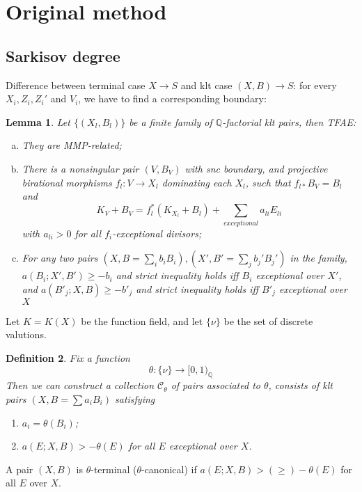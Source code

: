 \documentclass{article}
\newtheorem{defn}{Definition}[section]
\newtheorem{lem}[defn]{Lemma}
\begin{document}
\section{Original method}
 
\subsection{Sarkisov degree}
Difference between terminal case $ X\to S $ and klt case $ (X,B)\to S $: for every $ X_i,Z_i,Z_i' $ and $ V_i $, we have to find a corresponding boundary:

\begin{lem}
	Let $ \{(X_l,B_l)\} $ be a finite family of $ \mathbb{Q} $-factorial klt pairs, then TFAE:
	\begin{enumerate}[(a)]
		\item They are MMP-related;
		\item There is a nonsingular pair $ (V,B_V) $ with snc boundary, and projective birational morphisms $ f_l:V\to  X_l $ dominating each $ X_l $, such that $ f_{l*}B_V=B_l $ and
		$$ K_V+B_V=f_l^*(K_{X_l}+B_l)+\sum_{exceptional}{a_{li}E_{li}} $$
		with $ a_{li}>0 $ for all $ f_i $-exceptional divisors;
		\item For any two pairs $ (X,B=\sum_ib_iB_i),(X',B'=\sum _jb_j'B_j') $ in the family,  $ a(B_i;X',B')\geqslant -b_i $ and strict inequality holds iff $ B_i $ exceptional over $ X' $, and $ a(B'_j;X,B)\geqslant -b'_j $ and strict inequality holds iff $ B'_j $ exceptional over $ X $
	\end{enumerate}
\end{lem}
Let $ K=K(X) $ be the function field, and let $ \{\nu\} $ be the set of discrete valutions. 
\begin{defn}
	Fix a function 
	$$ \theta:\{\nu\}\to [0,1)_\mathbb{Q} $$
	Then we can construct a collection $ \mathcal{C}_\theta $ of pairs  associated to $ \theta $, consists of klt pairs $ (X,B=\sum a_iB_i) $ satisfying
	\begin{enumerate}
		\item $ a_i=\theta(B_i) $;
		\item $ a(E;X,B)>-\theta(E) $ for all $ E $ exceptional over $ X $.
	\end{enumerate} 
\end{defn}
A pair $ (X,B) $ is $ \theta $-terminal ($ \theta $-canonical) if $ a(E;X,B)>(\geqslant)-\theta(E) $ for all $ E $ over $ X $.
\end{document}
